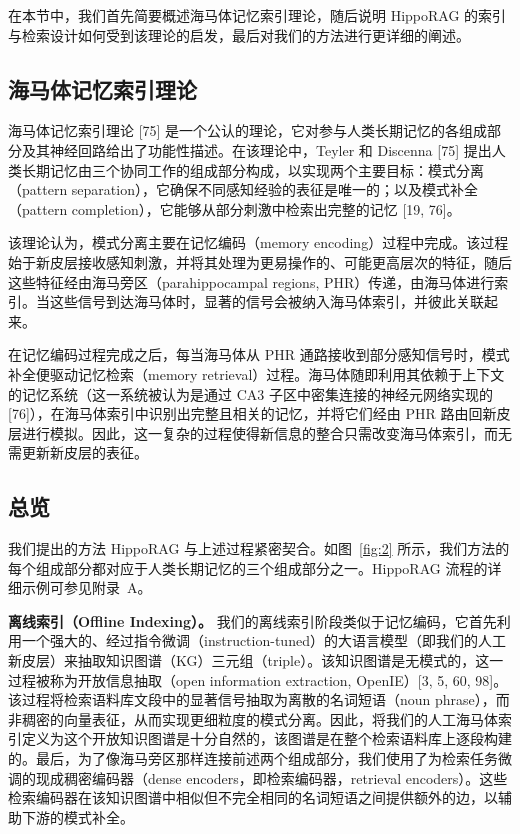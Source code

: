 \documentclass[11pt,UTF8,fontset=fandol]{ctexart}
\begin{document}
在本节中，我们首先简要概述海马体记忆索引理论，随后说明 HippoRAG 的索引与检索设计如何受到该理论的启发，最后对我们的方法进行更详细的阐述。

\subsection{海马体记忆索引理论}

海马体记忆索引理论 [75] 是一个公认的理论，它对参与人类长期记忆的各组成部分及其神经回路给出了功能性描述。在该理论中，Teyler 和 Discenna [75] 提出人类长期记忆由三个协同工作的组成部分构成，以实现两个主要目标：模式分离（pattern separation），它确保不同感知经验的表征是唯一的；以及模式补全（pattern completion），它能够从部分刺激中检索出完整的记忆 [19, 76]。

该理论认为，模式分离主要在记忆编码（memory encoding）过程中完成。该过程始于新皮层接收感知刺激，并将其处理为更易操作的、可能更高层次的特征，随后这些特征经由海马旁区（parahippocampal regions, PHR）传递，由海马体进行索引。当这些信号到达海马体时，显著的信号会被纳入海马体索引，并彼此关联起来。

在记忆编码过程完成之后，每当海马体从 PHR 通路接收到部分感知信号时，模式补全便驱动记忆检索（memory retrieval）过程。海马体随即利用其依赖于上下文的记忆系统（这一系统被认为是通过 CA3 子区中密集连接的神经元网络实现的 [76]），在海马体索引中识别出完整且相关的记忆，并将它们经由 PHR 路由回新皮层进行模拟。因此，这一复杂的过程使得新信息的整合只需改变海马体索引，而无需更新新皮层的表征。

\subsection{总览}

我们提出的方法 HippoRAG 与上述过程紧密契合。如图~\ref{fig:2} 所示，我们方法的每个组成部分都对应于人类长期记忆的三个组成部分之一。HippoRAG 流程的详细示例可参见附录~A。

\textbf{离线索引（Offline Indexing）。} 我们的离线索引阶段类似于记忆编码，它首先利用一个强大的、经过指令微调（instruction-tuned）的大语言模型（即我们的人工新皮层）来抽取知识图谱（KG）三元组（triple）。该知识图谱是无模式的，这一过程被称为开放信息抽取（open information extraction, OpenIE）[3, 5, 60, 98]。该过程将检索语料库文段中的显著信号抽取为离散的名词短语（noun phrase），而非稠密的向量表征，从而实现更细粒度的模式分离。因此，将我们的人工海马体索引定义为这个开放知识图谱是十分自然的，该图谱是在整个检索语料库上逐段构建的。最后，为了像海马旁区那样连接前述两个组成部分，我们使用了为检索任务微调的现成稠密编码器（dense encoders，即检索编码器，retrieval encoders）。这些检索编码器在该知识图谱中相似但不完全相同的名词短语之间提供额外的边，以辅助下游的模式补全。
\end{document}
